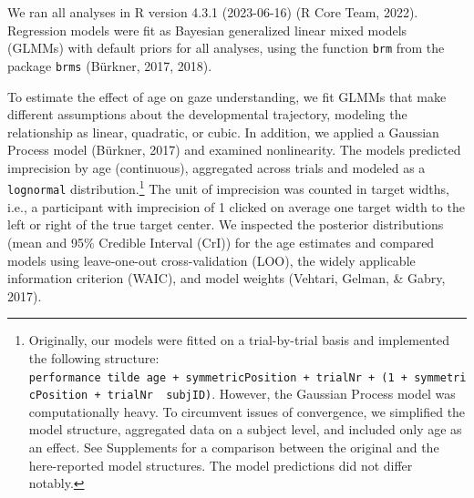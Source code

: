 \documentclass[
  man,mask,floatsintext]{apa6}
\begin{document}
We ran all analyses in R version 4.3.1 (2023-06-16) (R Core Team, 2022). Regression models were fit as Bayesian generalized linear mixed models (GLMMs) with default priors for all analyses, using the function \texttt{brm} from the package \texttt{brms} (Bürkner, 2017, 2018).

To estimate the effect of age on gaze understanding, we fit GLMMs that make different assumptions about the developmental trajectory, modeling the relationship as linear, quadratic, or cubic. In addition, we applied a Gaussian Process model (Bürkner, 2017) and examined nonlinearity. The models predicted imprecision by age (continuous), aggregated across trials and modeled as a \texttt{lognormal} distribution.\footnote{Originally, our models were fitted on a trial-by-trial basis and implemented the following structure: \texttt{performance\ tilde\ age\ +\ symmetricPosition\ +\ trialNr\ +\ (1\ +\ symmetricPosition\ +\ trialNr\ \textbar{}\ subjID)}. However, the Gaussian Process model was computationally heavy. To circumvent issues of convergence, we simplified the model structure, aggregated data on a subject level, and included only age as an effect. See Supplements for a comparison between the original and the here-reported model structures. The model predictions did not differ notably.} The unit of imprecision was counted in target widths, i.e., a participant with imprecision of 1 clicked on average one target width to the left or right of the true target center. We inspected the posterior distributions (mean and 95\% Credible Interval (CrI)) for the age estimates and compared models using leave-one-out cross-validation (LOO), the widely applicable information criterion (WAIC), and model weights (Vehtari, Gelman, \& Gabry, 2017).
\end{document}
